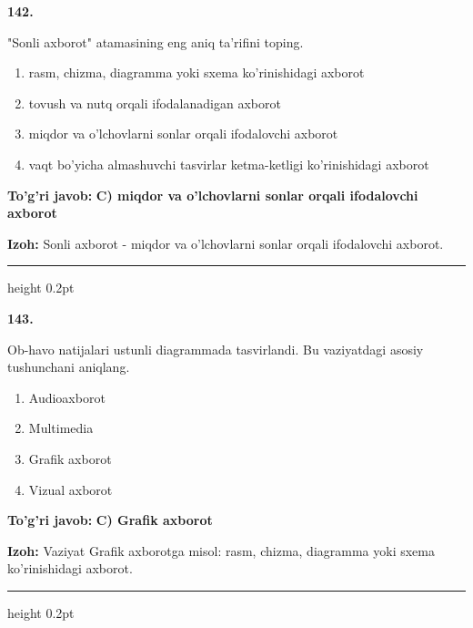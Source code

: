 \documentclass[10pt,a4paper,oneside]{article}
\begin{document}
\noindent\textbf{\color{ink}142.}
\par
"Sonli axborot" atamasining eng aniq ta'rifini toping.
\begin{enumerate}[label=\Alph*),leftmargin=9mm]
\item rasm, chizma, diagramma yoki sxema ko'rinishidagi axborot
\item tovush va nutq orqali ifodalanadigan axborot
\item miqdor va o'lchovlarni sonlar orqali ifodalovchi axborot
\item vaqt bo'yicha almashuvchi tasvirlar ketma-ketligi ko'rinishidagi axborot
\end{enumerate}
\begin{tcolorbox}[enhanced,breakable,colback=teal!4,colframe=teal!50!black,boxrule=0.5pt,arc=1.1mm,left=3mm,right=3mm,top=1.7mm,bottom=1.7mm,before skip=2mm,after skip=2mm]
\textbf{\color{teal}To'g'ri javob:} \textbf{C) miqdor va o'lchovlarni sonlar orqali ifodalovchi axborot}
\par\smallskip
\textbf{Izoh:} Sonli axborot - miqdor va o'lchovlarni sonlar orqali ifodalovchi axborot.
\end{tcolorbox}
\vspace{2mm}\hrule height 0.2pt \vspace{3mm}

\noindent\textbf{\color{ink}143.}
\par
Ob-havo natijalari ustunli diagrammada tasvirlandi. Bu vaziyatdagi asosiy tushunchani aniqlang.
\begin{enumerate}[label=\Alph*),leftmargin=9mm]
\item Audioaxborot
\item Multimedia
\item Grafik axborot
\item Vizual axborot
\end{enumerate}
\begin{tcolorbox}[enhanced,breakable,colback=teal!4,colframe=teal!50!black,boxrule=0.5pt,arc=1.1mm,left=3mm,right=3mm,top=1.7mm,bottom=1.7mm,before skip=2mm,after skip=2mm]
\textbf{\color{teal}To'g'ri javob:} \textbf{C) Grafik axborot}
\par\smallskip
\textbf{Izoh:} Vaziyat Grafik axborotga misol: rasm, chizma, diagramma yoki sxema ko'rinishidagi axborot.
\end{tcolorbox}
\vspace{2mm}\hrule height 0.2pt \vspace{3mm}
\end{document}
